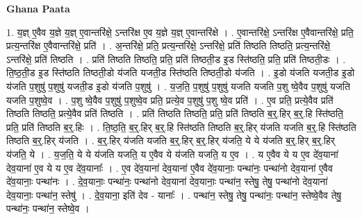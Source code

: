 \documentclass[17pt]{extarticle}
\begin{document}
\textbf{Ghana Paata } \newline

1. य॒ज्ञ् ए॒वैव य॒ज्ञे य॒ज्ञ् ए॒वान्तरि॑क्षे॒ ऽन्तरि॑क्ष ए॒व य॒ज्ञे य॒ज्ञ् ए॒वान्तरि॑क्षे । . ए॒वान्तरि॑क्षे॒ ऽन्तरि॑क्ष ए॒वैवान्तरि॑क्षे॒ प्रति॒ प्रत्य॒न्तरि॑क्ष ए॒वैवान्तरि॑क्षे॒ प्रति॑ । . अ॒न्तरि॑क्षे॒ प्रति॒ प्रत्य॒न्तरि॑क्षे॒ ऽन्तरि॑क्षे॒ प्रति॑ तिष्ठति तिष्ठति॒ प्रत्य॒न्तरि॑क्षे॒ ऽन्तरि॑क्षे॒ प्रति॑ तिष्ठति । . प्रति॑ तिष्ठति तिष्ठति॒ प्रति॒ प्रति॑ तिष्ठती॒ड इ॒ड स्ति॑ष्ठति॒ प्रति॒ प्रति॑ तिष्ठती॒डः । . ति॒ष्ठ॒ती॒ड इ॒ड स्ति॑ष्ठति तिष्ठती॒डो य॑जति यजती॒ड स्ति॑ष्ठति तिष्ठती॒डो य॑जति । . इ॒डो य॑जति यजती॒ड इ॒डो य॑जति प॒शुषु॑ प॒शुषु॑ यजती॒ड इ॒डो य॑जति प॒शुषु॑ । . य॒ज॒ति॒ प॒शुषु॑ प॒शुषु॑ यजति यजति प॒शु ष्वे॒वैव प॒शुषु॑ यजति यजति प॒शुष्वे॒व । . प॒शु ष्वे॒वैव प॒शुषु॑ प॒शुष्वे॒व प्रति॒ प्रत्ये॒व प॒शुषु॑ प॒शु ष्वे॒व प्रति॑ । . ए॒व प्रति॒ प्रत्ये॒वैव प्रति॑ तिष्ठति तिष्ठति॒ प्रत्ये॒वैव प्रति॑ तिष्ठति । . प्रति॑ तिष्ठति तिष्ठति॒ प्रति॒ प्रति॑ तिष्ठति ब॒र्॒.हिर् ब॒र्॒.हि स्ति॑ष्ठति॒ प्रति॒ प्रति॑ तिष्ठति ब॒र्॒.हिः । . ति॒ष्ठ॒ति॒ ब॒र्॒.हिर् ब॒र्॒.हि स्ति॑ष्ठति तिष्ठति ब॒र्॒.हिर् य॑जति यजति ब॒र्॒.हि स्ति॑ष्ठति तिष्ठति ब॒र्॒.हिर् य॑जति । . ब॒र्॒.हिर् य॑जति यजति ब॒र्॒.हिर् ब॒र्॒.हिर् य॑जति॒ ये ये य॑जति ब॒र्॒.हिर् ब॒र्॒.हिर् य॑जति॒ ये । . य॒ज॒ति॒ ये ये य॑जति यजति॒ य ए॒वैव ये य॑जति यजति॒ य ए॒व । . य ए॒वैव ये य ए॒व दे॑व॒याना॑ देव॒याना॑ ए॒व ये य ए॒व दे॑व॒यानाः᳚ । . ए॒व दे॑व॒याना॑ देव॒याना॑ ए॒वैव दे॑व॒यानाः॒ पन्था॑नः॒ पन्था॑नो देव॒याना॑ ए॒वैव दे॑व॒यानाः॒ पन्था॑नः । . दे॒व॒यानाः॒ पन्था॑नः॒ पन्था॑नो देव॒याना॑ देव॒यानाः॒ पन्था॑न॒ स्तेषु॒ तेषु॒ पन्था॑नो देव॒याना॑ देव॒यानाः॒ पन्था॑न॒ स्तेषु॑ । . दे॒व॒याना॒ इति॑ देव - यानाः᳚ । . पन्था॑न॒ स्तेषु॒ तेषु॒ पन्था॑नः॒ पन्था॑न॒ स्तेष्वे॒वैव तेषु॒ पन्था॑नः॒ पन्था॑न॒ स्तेष्वे॒व । \newline
\end{document}
